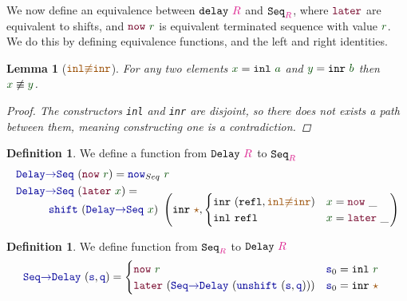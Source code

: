 \documentclass[twoside,11pt,openright]{report}
\theoremstyle{plain} %
\newtheorem{lem}[thm]{Lemma}
\theoremstyle{definition}
\newtheorem{defn}[thm]{Definition}%
\theoremstyle{remark}
\newcommand*{\term}[1]{\textcolor{green!30!black}{#1}} %
\newcommand*{\type}[1]{\textcolor{magenta!90!black}{#1}}
\newcommand*{\constant}[1]{\textcolor{orange!60!black}{\ensuremath{\mathtt{#1}}}}
\newcommand*{\function}[1]{\textcolor{blue!60!black}{\ensuremath{\mathtt{#1}}}}
\newcommand*{\constructor}[1]{\textcolor{purple!60!black}{\ensuremath{\mathtt{#1}}}}
\newcommand*{\typeformer}[1]{\ensuremath{\mathtt{#1}}}
\newcommand*{\unitelem}{\constant{\star}} %
\begin{document}
\noindent We now define an equivalence between \(\typeformer{delay}~\type{R}\) and \(\typeformer{Seq}_{\type{R}}\), where \(\constructor{later}\) are equivalent to shifts, and \(\constructor{now}~\term{r}\) is equivalent terminated sequence with value \(\term{r}\). We do this by defining equivalence functions, and the left and right identities.
\begin{lem}[\(\constant{inl{\not\equiv}inr}\)]
  For any two elements \(\term{x} = \mathtt{inl}~\term{a}\) and \(\term{y} = \mathtt{inr}~\term{b}\) then \(\term{x} \not\equiv \term{y}\).
  \begin{proof}
    The constructors \texttt{inl} and \texttt{inr} are disjoint, so there does not exists a path between them, meaning constructing one is a contradiction.
  \end{proof}
\end{lem}
\begin{defn}
  We define a function from \(\typeformer{Delay}~\type{R}\) to \(\typeformer{Seq}_{\type{R}}\)
  \begin{equation}
    \begin{aligned}
      \function{Delay{\rightarrow}Seq}&~(\constructor{now}~\term{r}) = \function{now}_{Seq}~\term{r} \\
      \function{Delay{\rightarrow}Seq}&~(\constructor{later}~\term{x}) = \\[-3mm]
      & \strut\hspace{-8mm}\function{shift}~(\function{Delay{\rightarrow}Seq}~\term{x})~\left(\mathtt{inr}~\unitelem , \begin{cases} \mathtt{inr}~(\mathtt{refl} , \constant{inl{\not\equiv}inr}) & \term{x} = \constructor{now}~\_ \\ \mathtt{inl}~\mathtt{refl} & \term{x} = \constructor{later}~\_ \end{cases}\right)
    \end{aligned}
  \end{equation}
\end{defn}
\begin{defn}
  We define function from \(\typeformer{Seq}_{\type{R}}\) to \(\typeformer{Delay}~\type{R}\)
    \begin{equation}
      \begin{aligned}
        \function{Seq{\rightarrow}Delay}&~(\function{s} , \function{q}) = \begin{cases} \constructor{now}~\term{r} & \function{s}_0 = \mathtt{inl}~\term{r} \\ \constructor{later}~(\function{Seq{\rightarrow}Delay}~(\function{unshift}~(\function{s} , \function{q}))) & \function{s}_0 = \mathtt{inr}~\unitelem \end{cases}
      \end{aligned}
    \end{equation}
\end{defn}
\end{document}
